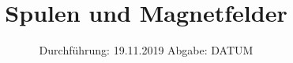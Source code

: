 
\usepackage{amssymb}
\subject{308}
\title{Spulen und Magnetfelder}
\date{%
  Durchführung: 19.11.2019
  \hspace{3em}
  Abgabe: DATUM
}



\maketitle
\thispagestyle{empty}
\tableofcontents
\newpage






\nocite{V308}
\printbibliography{}


